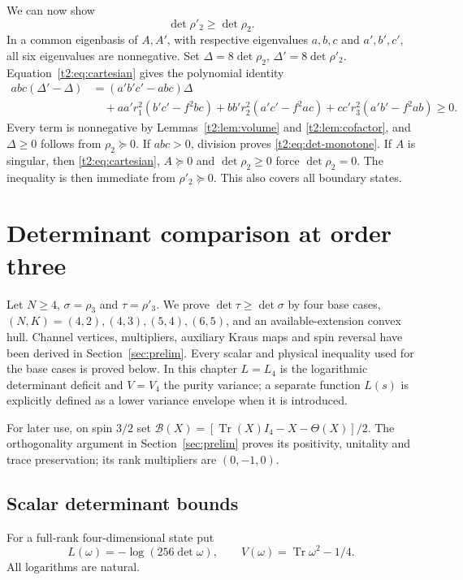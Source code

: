 \documentclass[11pt,a4paper]{article}
\newcommand{\Tr}{\operatorname{Tr}}
\begin{document}
We can now show
\begin{equation}\label{t2:eq:det-monotone}
 \det\rho'_2\ge\det\rho_2.
\end{equation}
In a common eigenbasis of $A,A'$, with respective eigenvalues $a,b,c$
and $a',b',c'$, all six eigenvalues are nonnegative. Set
$\Delta=8\det\rho_2$, $\Delta'=8\det\rho'_2$.
Equation~\eqref{t2:eq:cartesian} gives the polynomial identity
\begin{align*}
 abc(\Delta'-\Delta)
 &=(a'b'c'-abc)\Delta\\
 &\quad+aa'r_1^2(b'c'-f^2bc)
       +bb'r_2^2(a'c'-f^2ac)
       +cc'r_3^2(a'b'-f^2ab)\ge0.
\end{align*}
Every term is nonnegative by Lemmas~\ref{t2:lem:volume} and
\ref{t2:lem:cofactor}, and $\Delta\ge0$ follows from $\rho_2\succeq0$.
If $abc>0$, division proves \eqref{t2:eq:det-monotone}.
If $A$ is singular, then
\eqref{t2:eq:cartesian}, $A\succeq0$ and $\det\rho_2\ge0$ force
$\det\rho_2=0$. The inequality is then immediate from
$\rho'_2\succeq0$. This also covers all boundary states.

\clearpage
\section{Determinant comparison at order three}\label{sec:t3}
Let $N\ge4$, $\sigma=\rho_3$ and $\tau=\rho'_3$. We prove
$\det\tau\ge\det\sigma$ by four base cases,
$(N,K)=(4,2),(4,3),(5,4),(6,5)$, and an available-extension convex hull.
Channel vertices, multipliers, auxiliary Kraus maps and spin reversal have
been derived in Section~\ref{sec:prelim}. Every scalar and physical
inequality used for the base cases is proved below. In this chapter
$L=L_4$ is the logarithmic determinant deficit and $V=V_4$ the purity
variance; a separate function $L(s)$ is explicitly defined as a lower
variance envelope when it is introduced.

For later use, on spin $3/2$ set
$\mathcal B(X)=[\operatorname{Tr}(X)I_4-X-\Theta(X)]/2$.
The orthogonality argument in Section~\ref{sec:prelim} proves its
positivity, unitality and trace preservation; its rank multipliers are
$(0,-1,0)$.

\subsection{Scalar determinant bounds}
For a full-rank four-dimensional state put
\[
 L(\omega)=-\log(256\det\omega),\qquad
 V(\omega)=\Tr\omega^2-1/4.
\]
All logarithms are natural.
\end{document}
